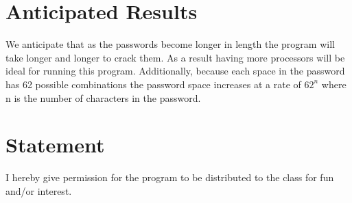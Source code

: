 \documentclass[11pt]{article}
\begin{document}
\section{Anticipated Results}

We anticipate that as the passwords become longer in length the program will take longer and longer to crack them. As a result having more processors will be ideal for running this program. Additionally, because each space in the password has 62 possible combinations the password space increases at a rate of $62^n$ where n is the number of characters in the password.

\section{Statement}
I hereby give permission for the program to be distributed to the class for fun and/or interest.
\end{document}
